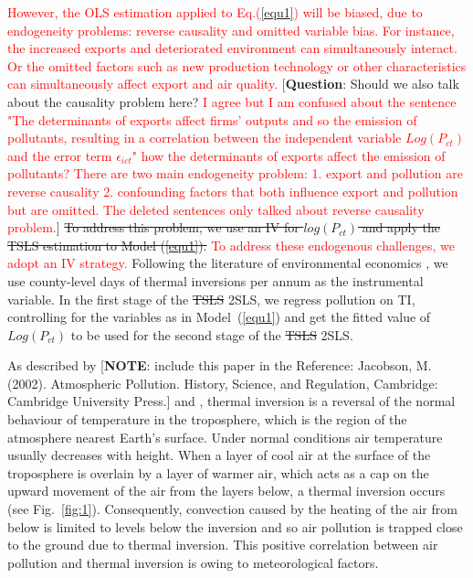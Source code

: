 \documentclass[12pt]{article}
\begin{document}
\textcolor{red}{However, the OLS estimation applied to Eq.(\ref{equ1}) will be biased, due to endogeneity problems: reverse causality and omitted variable bias. For instance, the increased exports and deteriorated environment can simultaneously interact. Or the omitted factors such as new production technology or other characteristics can simultaneously aﬀect export and air quality. }[\textbf{Question}:
Should we also talk about the causality problem here? \textcolor{red}{I agree but I am confused about the sentence "The determinants of exports affect firms' outputs and so the emission of pollutants, resulting in a correlation between the independent
variable $Log(P_{ct})$ and the error term $\epsilon _{ict}$" how the determinants of exports affect the emission of pollutants? There are two main endogeneity problem: 1. export and pollution are reverse causality 2. confounding factors that both influence export and pollution but are omitted. The deleted sentences only talked about reverse causality problem.}] \sout{To address this
problem, we use an IV for $log(P_{ct})$ and apply the TSLS estimation to
Model (\ref{equ1}).} \textcolor{red}{To address these endogenous challenges, we adopt an IV strategy.} Following the literature of environmental economics %
\citep{arceo2016does,jans2018economic,sager2019estimating,fu2021air,NBERw28401}%
, we use county-level days of thermal inversions per annum as the
instrumental variable. In the first stage of the \sout{TSLS} 2SLS, we regress pollution
on TI, controlling for the variables as in Model~(\ref{equ1}) and get the
fitted value of $Log(P_{ct})$ to be used for the second stage of the \sout{TSLS} 2SLS.

As described by \cite{jacobson2002atmospheric}[\textbf{NOTE}: include this paper in the
Reference: Jacobson, M. (2002). Atmospheric Pollution. History, Science, and
Regulation, Cambridge: Cambridge University Press.] and \cite{arceo2016does},
thermal inversion is a reversal of the normal behaviour of temperature in
the troposphere, which is the region of the atmosphere nearest Earth's
surface. Under normal conditions air temperature usually decreases with
height. When a layer of cool air at the surface of the troposphere is
overlain by a layer of warmer air, which acts as a cap on the upward
movement of the air from the layers below, a thermal inversion occurs (see
Fig.~\ref{fig:1}). Consequently, convection caused by the heating of the air
from below is limited to levels below the inversion and so air pollution is
trapped close to the ground due to thermal inversion. This positive
correlation between air pollution and thermal inversion is owing to
meteorological factors.
\end{document}
